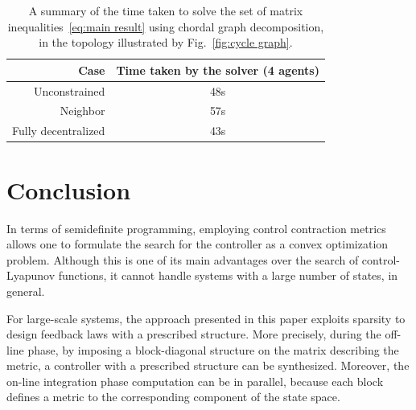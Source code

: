 \documentclass[10pt,twocolumn,twoside]{IEEEtran}
\newcounter{para}
\newcommand\mypara{\par}
\theoremstyle{plain}
\theoremstyle{definition}
\theoremstyle{remark}
\begin{document}
\begin{table}
	\begin{tabular}{r|c}
	Case&Time taken by the solver (4 agents)\\ \hline
	Unconstrained&48s\\
	Neighbor&57s\\
	Fully decentralized&43s\\\hline
	\end{tabular}\vspace{1em}
	\caption{A summary of the time taken to solve the set of matrix inequalities~\eqref{eq:main result} using chordal graph decomposition, in the topology illustrated by Fig.~\ref{fig:cycle graph}.}
	\label{tab:mixed example}
\end{table}

\section{Conclusion}\label{sec:Conclusion}

\mypara In terms of semidefinite programming, employing control contraction metrics allows one to formulate the search for the controller as a convex optimization problem. Although this is one of its main advantages over the search of control-Lyapunov functions, it cannot handle systems with a large number of states, in general.

\mypara For large-scale systems, the approach presented in this paper exploits sparsity to design feedback laws with a prescribed structure. More precisely, during the off-line phase, by imposing a block-diagonal structure on the matrix describing the metric, a controller with a prescribed structure can be synthesized. Moreover, the on-line integration phase computation can be in parallel, because each block defines a metric to the corresponding component of the state space.

\appendices


\ifCLASSOPTIONcaptionsoff
  \newpage
\fi





%
%
%



\end{document}
